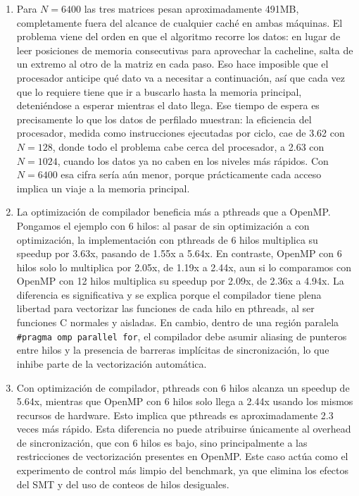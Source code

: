 \begin{enumerate}
   \item Para $N=6400$ las tres matrices pesan aproximadamente 491MB, completamente fuera del alcance de cualquier caché en ambas máquinas. El problema viene del orden en que el algoritmo recorre los datos: en lugar de leer posiciones de memoria consecutivas para aprovechar la cacheline, salta de un extremo al otro de la matriz en cada paso. Eso hace imposible que el procesador anticipe qué dato va a necesitar a continuación, así que cada vez que lo requiere tiene que ir a buscarlo hasta la memoria principal, deteniéndose a esperar mientras el dato llega. Ese tiempo de espera es precisamente lo que los datos de perfilado muestran: la eficiencia del procesador, medida como instrucciones ejecutadas por ciclo, cae de 3.62 con $N=128$, donde todo el problema cabe cerca del procesador, a 2.63 con $N=1024$, cuando los datos ya no caben en los niveles más rápidos. Con $N=6400$ esa cifra sería aún menor, porque prácticamente cada acceso implica un viaje a la memoria principal.
   
   \item La optimización de compilador beneficia más a pthreads que a OpenMP. Pongamos el ejemplo con 6 hilos: al pasar de sin optimización a con optimización, la implementación con pthreads de 6 hilos multiplica su speedup por 3.63x, pasando de 1.55x a 5.64x. En contraste, OpenMP con 6 hilos solo lo multiplica por 2.05x, de 1.19x a 2.44x, aun si lo comparamos con OpenMP con 12 hilos multiplica su speedup por 2.09x, de 2.36x a 4.94x. La diferencia es significativa y se explica porque el compilador tiene plena libertad para vectorizar las funciones de cada hilo en pthreads, al ser funciones C normales y aisladas. En cambio, dentro de una región paralela \texttt{\#pragma omp parallel for}, el compilador debe asumir aliasing de punteros entre hilos y la presencia de barreras implícitas de sincronización, lo que inhibe parte de la vectorización automática.

    \item Con optimización de compilador, pthreads con 6 hilos alcanza un speedup de 5.64x, mientras que OpenMP con 6 hilos solo llega a 2.44x usando los mismos recursos de hardware. Esto implica que pthreads es aproximadamente 2.3 veces más rápido. Esta diferencia no puede atribuirse únicamente al overhead de sincronización, que con 6 hilos es bajo, sino principalmente a las restricciones de vectorización presentes en OpenMP. Este caso actúa como el experimento de control más limpio del benchmark, ya que elimina los efectos del SMT y del uso de conteos de hilos desiguales.


\end{enumerate}
